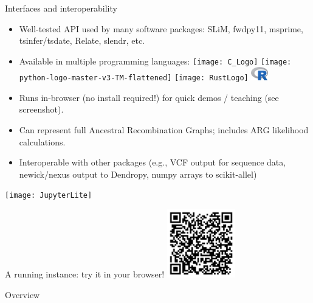 \documentclass[landscape,a0paper,fontscale=0.4]{baposter}
\newcommand{\compresslist}{%
 \setlength{\itemsep}{1pt}%
 \setlength{\parskip}{0pt}%
 \setlength{\parsep}{0pt}%
 }
\begin{document}
\begin{poster}
\begin{posterbox}[name=interop,column=0,row=0,span=2,below=inout]{Interfaces and interoperability}
\begin{multicols}{2}
\begin{itemize} \compresslist
    \item Well-tested API used by many software packages: SLiM, fwdpy11, msprime, tsinfer/tsdate, Relate, slendr, etc.
    \item Available in multiple programming languages:
        \texttt{[image: C\_Logo]}
        \texttt{[image: python-logo-master-v3-TM-flattened]}
        \texttt{[image: RustLogo]}
        \includegraphics[width=2em]{R-logo}
    \item Runs in-browser (no install required!) for quick demos / teaching (see screenshot).
    \item Can represent full Ancestral Recombination Graphs; includes ARG likelihood calculations.
    \item Interoperable with other packages (e.g., VCF output for sequence data, newick/nexus output to Dendropy, numpy arrays to scikit-allel)
\end{itemize}

% 

    \texttt{[image: JupyterLite]}

    A running instance: try it in your browser!
    \includegraphics[width=8em]{running-instance-qr}

\end{multicols}

\end{posterbox}

\begin{posterbox}[name=overview,column=1,row=0,span=2]{Overview}


\end{posterbox}
\end{poster}
\end{document}
